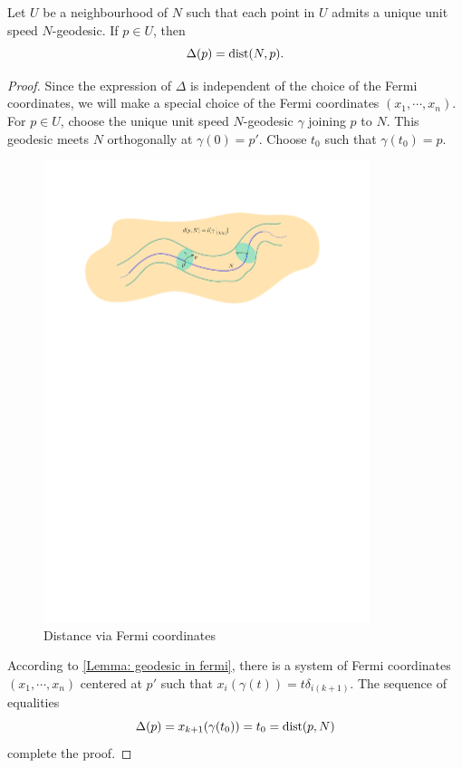 \vspace{0.3cm}
\begin{prop}\label{dsq-Fermi}
    Let $U$ be a neighbourhood of $N$ such that each point in $U$ admits a unique unit speed $N$-geodesic. If $p\in U$, then 
    \begin{displaymath}
        \Delta(p) = \operatorname{dist}(N,p).
    \end{displaymath}
\end{prop}
\vspace{0.1cm}
\begin{proof}
    Since the expression of $\Delta$ is independent of the choice of the Fermi coordinates, we will make a special choice of the Fermi coordinates $(x_1,\cdots,x_n)$. For $p\in U$, choose the unique unit speed $N$-geodesic $\gamma$ joining $p$ to $N$. This geodesic meets $N$ orthogonally at $\gamma(0)=p'$. Choose $t_0$ such that $\gamma(t_0)= p$.
    \begin{figure}[!htpb]
        \centering
        \includegraphics[width=0.85\textwidth]{figures/Fermi.pdf}
        \caption{Distance via Fermi coordinates}
        \label{fig:distancesquared}
    \end{figure}
    \noindent According to \autoref{Lemma: geodesic in fermi}, there is a system of Fermi coordinates $(x_1,\cdots,x_n)$ centered at $p'$ such that $x_i(\gamma(t)) = t\delta_{i(k+1)}$. The sequence of equalities 
    \begin{displaymath}
        \Delta(p) = x_{k+1}(\gamma(t_0)) = t_0 = \operatorname{dist}(p,N)
    \end{displaymath}
    complete the proof.
\end{proof}

